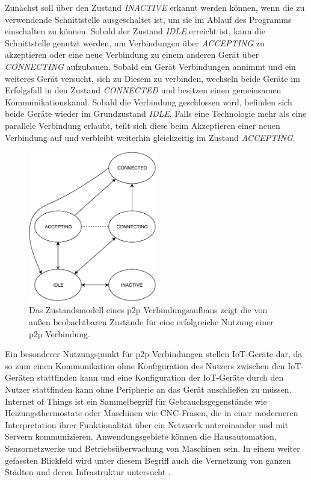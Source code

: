     Zunächst soll über den Zustand {\it INACTIVE} erkannt werden können, wenn die zu verwendende Schnittstelle ausgeschaltet ist, um sie im Ablauf des Programms einschalten zu können. Sobald der Zustand {\it IDLE} erreicht ist, kann die Schnittstelle genutzt werden, um Verbindungen über {\it ACCEPTING} zu akzeptieren oder eine neue Verbindung zu einem anderen Gerät über {\it CONNECTING} aufzubauen. Sobald ein Gerät Verbindungen annimmt und ein weiteres Gerät versucht, sich zu Diesem zu verbinden, wechseln beide Geräte im Erfolgsfall in den Zustand {\it CONNECTED} und besitzen einen gemeinsamen Kommunikationskanal. Sobald die Verbindung geschlossen wird, befinden sich beide Geräte wieder im Grundzustand {\it IDLE}. Falls eine Technologie mehr als eine parallele Verbindung erlaubt, teilt sich diese beim Akzeptieren einer neuen Verbindung auf und verbleibt weiterhin gleichzeitig im Zustand {\it ACCEPTING}.

    \begin{figure}[ht]
         \centering
	      \includegraphics[width=0.5\textwidth]{p2p-State.pdf}
    	   \caption[Zustandsmodell eines p2p Verbindungsaufbaus]{Das Zustandsmodell eines p2p Verbindungsaufbaus zeigt die von außen beobachtbaren Zustände für eine erfolgreiche Nutzung einer p2p Verbindung. } \label{p2p:state}
	\end{figure}   

    Ein besonderer Nutzungspunkt für p2p Verbindungen stellen IoT-Geräte dar, da so zum einen Kommunikation ohne Konfiguration des Nutzers zwischen den IoT-Geräten stattfinden kann und eine Konfiguration der IoT-Geräte durch den Nutzer stattfinden kann ohne Peripherie an das Gerät anschließen zu müssen. Internet of Things ist ein Sammelbegriff für Gebrauchsgegenstände wie Heizungsthermostate oder Maschinen wie CNC-Fräsen, die in einer moderneren Interpretation ihrer Funktionalität über ein Netzwerk untereinander und mit Servern kommunizieren. Anwendungsgebiete können die Hausautomation, Sensornetzwerke und Betriebsüberwachung von Maschinen sein. In einem weiter gefassten Blickfeld wird unter diesem Begriff auch die Vernetzung von ganzen Städten und deren Infrastruktur untersucht \cite{ituGroup}.
    
